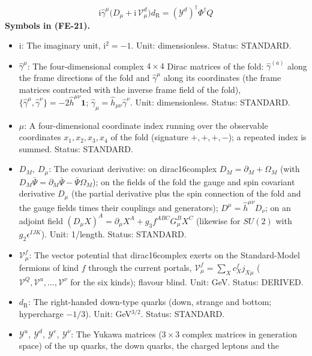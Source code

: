 \documentclass[
  10pt,
]{article}
\providecommand{\tightlist}{%
  \setlength{\itemsep}{0pt}\setlength{\parskip}{0pt}}
\begin{document}
\[
\mathrm{i}\hat\gamma^\mu\big(D_\mu + \mathrm{i}\,\mathcal{V}^{d}_\mu\big)d_{\mathrm{R}} = (\mathcal{Y}^{d})^\dagger\Phi^\dagger Q \tag{FE-21}
\] \textbf{Symbols in (FE-21).}

\begin{itemize}
\tightlist
\item
  \(\mathrm{i}\): The imaginary unit, \(\mathrm{i}^2 = -1\). Unit:
  dimensionless. Status: STANDARD.
\item
  \(\hat\gamma^\mu\): The four-dimensional complex \(4 \times 4\) Dirac
  matrices of the fold: \(\hat\gamma^{(a)}\) along the frame directions
  of the fold and \(\hat\gamma^\mu\) along its coordinates (the frame
  matrices contracted with the inverse frame field of the fold),
  \(\{\hat\gamma^\mu, \hat\gamma^\nu\} = -2\hat h^{\mu\nu}\mathbf{1}\);
  \(\hat\gamma_\mu = \hat h_{\mu\nu}\hat\gamma^\nu\). Unit:
  dimensionless. Status: STANDARD.
\item
  \(\mu\): A four-dimensional coordinate index running over the
  observable coordinates \(x_1, x_2, x_3, x_4\) of the fold (signature
  \(+,+,+,-\)); a repeated index is summed. Status: STANDARD.
\item
  \(D_M,\ D_\mu\): The covariant derivative: on dirac16complex
  \(D_M = \partial_M + \Omega_M\) (with
  \(D_M\bar\Psi = \partial_M\bar\Psi - \bar\Psi\Omega_M\)); on the
  fields of the fold the gauge and spin covariant derivative \(D_\mu\)
  (the partial derivative plus the spin connection of the fold and the
  gauge fields times their couplings and generators);
  \(D^\mu = \hat h^{\mu\nu}D_\nu\); on an adjoint field
  \((D_\mu X)^A = \partial_\mu X^A + g_3f^{ABC}G^B_\mu X^C\) (likewise
  for \(SU(2)\) with \(g_2\epsilon^{IJK}\)). Unit: 1/length. Status:
  STANDARD.
\item
  \(\mathcal{V}^{f}_\mu\): The vector potential that dirac16complex
  exerts on the Standard-Model fermions of kind \(f\) through the
  current portals, \(\mathcal{V}^{f}_\mu = \sum_Xc^{f}_Xj_{X\mu}\)
  (\(\mathcal{V}^{Q}, \mathcal{V}^{u}, \dots, \mathcal{V}^{\nu}\) for
  the six kinds); flavour blind. Unit: GeV. Status: DERIVED.
\item
  \(d_{\mathrm{R}}\): The right-handed down-type quarks (down, strange
  and bottom; hypercharge \(-1/3\)). Unit: GeV\(^{3/2}\). Status:
  STANDARD.
\item
  \(\mathcal{Y}^{u},\ \mathcal{Y}^{d},\ \mathcal{Y}^{e},\ \mathcal{Y}^{\nu}\):
  The Yukawa matrices (\(3 \times 3\) complex matrices in generation
  space) of the up quarks, the down quarks, the charged leptons and the

\end{itemize}
\end{document}
